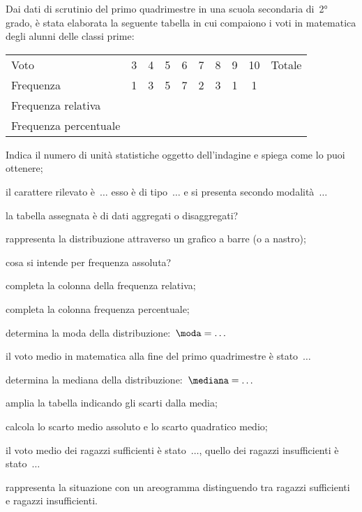 \begin{esercizio}
\label{ese:A.47}
Dai dati di scrutinio del primo quadrimestre in una scuola secondaria di~2° 
grado, è stata elaborata la seguente tabella in cui compaiono i voti in 
matematica degli alunni delle classi prime:
\begin{center}
\begin{tabular}{l*{9}{c}}
\toprule
Voto&3 &4 &5 &6 &7 &8 &9 &10 &Totale\\
Frequenza &1&3&5&7&2&3&1&1&\\
Frequenza relativa&&&&&&&&&\\
Frequenza percentuale&&&&&&&&&\\
\bottomrule
\end{tabular}
\end{center}
\begin{enumeratea}
 \item Indica il numero di unità statistiche oggetto dell'indagine e spiega 
come lo puoi ottenere;
 \item il carattere rilevato è~\(\dots\) esso è di tipo~\(\dots\) e si presenta 
secondo modalità~\(\dots\)
 \item la tabella assegnata è di dati aggregati o disaggregati?
 \item rappresenta la distribuzione attraverso un grafico a barre (o a 
nastro);
 \item cosa si intende per frequenza assoluta?
 \item completa la colonna della frequenza relativa;
 \item completa la colonna frequenza percentuale;
 \item determina la moda della distribuzione:~\(\moda = \dots\)
 \item il voto medio in matematica alla fine del primo quadrimestre è 
stato~\(\dots\)
 \item determina la mediana della distribuzione:~\(\mediana= \dots\)
 \item amplia la tabella indicando gli scarti dalla media;
 \item calcola lo scarto medio assoluto e lo scarto quadratico medio;
 \item il voto medio dei ragazzi sufficienti è stato~\(\dots\), quello dei 
ragazzi insufficienti è stato~\(\dots\)
 \item rappresenta la situazione con un areogramma distinguendo tra ragazzi 
sufficienti e ragazzi insufficienti.
 \end{enumeratea}
\end{esercizio}

